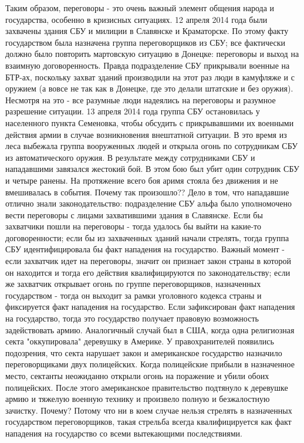 Таким образом, переговоры - это очень важный элемент общения народа и государства, особенно в кризисных ситуациях.
12  апреля 2014 года были захвачены здания СБУ и милиции в Славянске и Краматорске.  По этому факту государством была назначена группа переговорщиков из СБУ; все фактически должно было повторить мартовскую ситуацию в Донецке: переговоры и выход на взаимную договоренность. Правда подразделение СБУ прикрывали военные на БТР-ах, поскольку захват зданий производили на этот раз люди в камуфляже и с оружием (а вовсе не так как в Донецке, где это делали штатские и без оружия). Несмотря на это - все разумные люди надеялись на переговоры и разумное разрешение ситуации.
13 апреля 2014 года группа СБУ остановилась у населенного пункта Семеновка, чтобы обсудить с прикрывавшими их военными действия армии в случае возникновения внештатной ситуации. В это время из леса выбежала группа вооруженных людей и открыла огонь по сотрудникам СБУ из автоматического оружия. В результате между сотрудниками СБУ и нападавшими завязался жестокий бой.  В этом бою был убит один сотрудник СБУ и четыре ранены.
На протяжение всего боя аримя стояла без движения и не вмешивалась в события. Почему так произошло??
Дело в том, что нападавшие отлично знали законодательство: подразделение СБУ альфа было уполномочено вести переговоры с лицами захватившими здания в Славянске. Если бы захватчики пошли на переговоры - тогда удалось бы выйти на какие-то договоренности; если бы из захваченных зданий начали стрелять, тогда группа СБУ идентифицировала бы факт нападения на государство. Важный момент - если захватчик идет на переговоры, значит он признает закон страны в которой он находится и тогда его действия квалифицируются по законодательству; если же захватчик открывает огонь по группе переговорщиков, назначенных государством - тогда он выходит за рамки уголовного кодекса страны и фиксируется факт нападения на государство. Если зафиксирован факт нападения на государство, тогда это государство получает правовую возможность задействовать армию.
Аналогичный случай был в США, когда одна религиозная секта "оккупировала" деревушку в Америке. У правохранителей появились подозрения, что секта нарушает закон и американское государство назначило переговорщиками двух полицейских. Когда полицейские прибыли в назначенное место, сектанты неожиданно открыли огонь на поражение и убили обоих полицейских. После этого американское правительство подтянуло к деревушке армию и тяжелую военную технику и произвело полную и безжалостную зачистку. 
Почему? Потому что ни в коем случае нельзя стрелять в назначенных государством переговорщиков, такая стрельба всегда квалифицируется как факт нападения на государство со всеми вытекающими последствиями.

